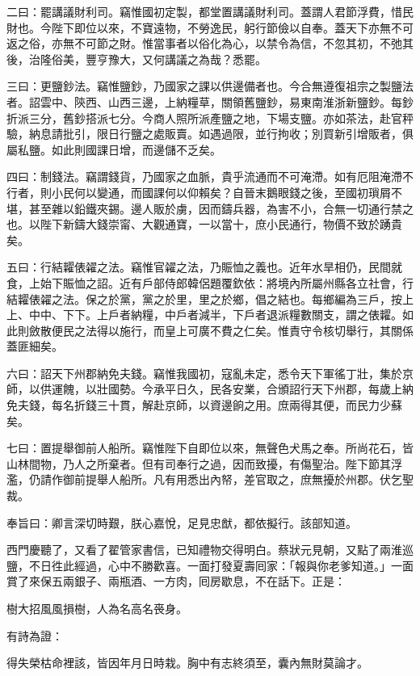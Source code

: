 二曰：罷講議財利司。竊惟國初定製，都堂置講議財利司。蓋謂人君節浮費，惜民財也。今陛下即位以來，不寶遠物，不勞逸民，躬行節儉以自奉。蓋天下亦無不可返之俗，亦無不可節之財。惟當事者以俗化為心，以禁令為信，不忽其初，不弛其後，治隆俗美，豐亨豫大，又何講議之為哉？悉罷。

三曰：更鹽鈔法。竊惟鹽鈔，乃國家之課以供邊備者也。今合無遵復祖宗之製鹽法者。詔雲中、陝西、山西三邊，上納糧草，關領舊鹽鈔，易東南淮浙新鹽鈔。每鈔折派三分，舊鈔搭派七分。今商人照所派產鹽之地，下場支鹽。亦如茶法，赴官秤驗，納息請批引，限日行鹽之處販賣。如遇過限，並行拘收；別買新引增販者，俱屬私鹽。如此則國課日增，而邊儲不乏矣。

四曰：制錢法。竊謂錢貨，乃國家之血脈，貴乎流通而不可淹滯。如有厄阻淹滯不行者，則小民何以變通，而國課何以仰賴矣？自晉末鵝眼錢之後，至國初瑣屑不堪，甚至雜以鉛鐵夾錫。邊人販於虜，因而鑄兵器，為害不小，合無一切通行禁之也。以陛下新鑄大錢崇甯、大觀通寶，一以當十，庶小民通行，物價不致於踴貴矣。

五曰：行結糶俵糴之法。竊惟官糴之法，乃賑恤之義也。近年水旱相仍，民間就食，上始下賑恤之詔。近有戶部侍郎韓侶題覆欽依：將境內所屬州縣各立社會，行結糶俵糴之法。保之於黨，黨之於里，里之於鄉，倡之結也。每鄉編為三戶，按上上、中中、下下。上戶者納糧，中戶者減半，下戶者退派糧數關支，謂之俵糶。如此則斂散便民之法得以施行，而皇上可廣不費之仁矣。惟責守令核切舉行，其關係蓋匪細矣。

六曰：詔天下州郡納免夫錢。竊惟我國初，寇亂未定，悉令天下軍徭丁壯，集於京師，以供運餽，以壯國勢。今承平日久，民各安業，合頒詔行天下州郡，每歲上納免夫錢，每名折錢三十貫，解赴京師，以資邊餉之用。庶兩得其便，而民力少蘇矣。

七曰：置提舉御前人船所。竊惟陛下自即位以來，無聲色犬馬之奉。所尚花石，皆山林間物，乃人之所棄者。但有司奉行之過，因而致擾，有傷聖治。陛下節其浮濫，仍請作御前提舉人船所。凡有用悉出內帑，差官取之，庶無擾於州郡。伏乞聖裁。{}

奉旨曰：卿言深切時艱，朕心嘉悅，足見忠猷，都依擬行。該部知道。

西門慶聽了，又看了翟管家書信，已知禮物交得明白。蔡狀元見朝，又點了兩淮巡鹽，不日徃此經過，心中不勝歡喜。一面打發夏壽囘家：「報與你老爹知道。」一面賞了來保五兩銀子、兩瓶酒、一方肉，囘房歇息，不在話下。正是：

樹大招風風損樹，人為名高名䘮身。

有詩為證：

得失榮枯命裡該，皆因年月日時栽。胸中有志終須至，囊內無財莫論才。


